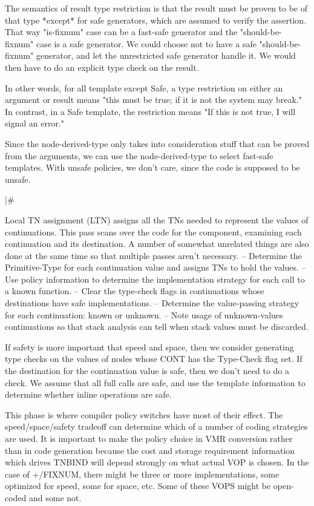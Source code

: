     The semantics of result type restriction is that the result must be proven
    to be of that type *except* for safe generators, which are assumed to
    verify the assertion.  That way "is-fixnum" case can be a fast-safe
    generator and the "should-be-fixnum" case is a safe generator.  We could
    choose not to have a safe "should-be-fixnum" generator, and let the
    unrestricted safe generator handle it.  We would then have to do an
    explicit type check on the result.

    In other words, for all template except Safe, a type restriction on either
    an argument or result means "this must be true; if it is not the system may
    break."  In contrast, in a Safe template, the restriction means "If this is
    not true, I will signal an error."

    Since the node-derived-type only takes into consideration stuff that can be
    proved from the arguments, we can use the node-derived-type to select
    fast-safe templates.  With unsafe policies, we don't care, since the code
    is supposed to be unsafe.

|\#

Local TN assignment (LTN) assigns all the TNs needed to represent the values of
continuations.  This pass scans over the code for the component, examining each
continuation and its destination.  A number of somewhat unrelated things are
also done at the same time so that multiple passes aren't necessary.
 -- Determine the Primitive-Type for each continuation value and assigns TNs
    to hold the values.
 -- Use policy information to determine the implementation strategy for each
    call to a known function.
 -- Clear the type-check flags in continuations whose destinations have safe
    implementations.
 -- Determine the value-passing strategy for each continuation: known or
    unknown.
 -- Note usage of unknown-values continuations so that stack analysis can tell
    when stack values must be discarded.
 
If safety is more important that speed and space, then we consider generating
type checks on the values of nodes whose CONT has the Type-Check flag set.  If
the destination for the continuation value is safe, then we don't need to do
a check.  We assume that all full calls are safe, and use the template
information to determine whether inline operations are safe.

This phase is where compiler policy switches have most of their effect.  The
speed/space/safety tradeoff can determine which of a number of coding
strategies are used.  It is important to make the policy choice in VMR
conversion rather than in code generation because the cost and storage
requirement information which drives TNBIND will depend strongly on what actual
VOP is chosen.  In the case of +/FIXNUM, there might be three or more
implementations, some optimized for speed, some for space, etc.  Some of these
VOPS might be open-coded and some not.

